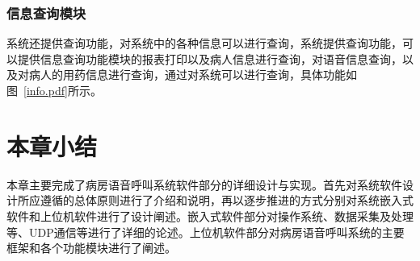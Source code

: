 \subsubsection{信息查询模块}
系统还提供查询功能，对系统中的各种信息可以进行查询，系统提供查询功能，可以提供信息查询功能模块的报表打印以及病人信息进行查询，对语音信息查询，以及对病人的用药信息进行查询，通过对系统可以进行查询，具体功能如图~\ref{info.pdf}所示。

\section{本章小结}
本章主要完成了病房语音呼叫系统软件部分的详细设计与实现。首先对系统软件设计所应遵循的总体原则进行了介绍和说明，再以逐步推进的方式分别对系统嵌入式软件和上位机软件进行了设计阐述。嵌入式软件部分对操作系统、数据采集及处理等、UDP通信等进行了详细的论述。上位机软件部分对病房语音呼叫系统的主要框架和各个功能模块进行了阐述。
